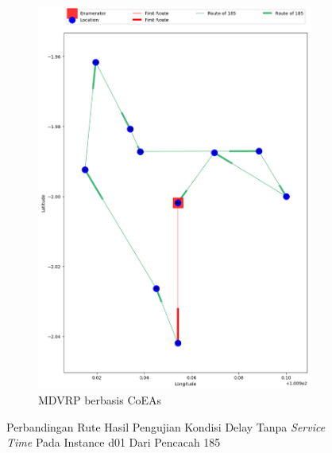 \begin{figure}[H]
	\centering
	\begin{subfigure}[t]{\textwidth}
		\centering
		\includegraphics[width=\textwidth]{Resources/Images/delayed_1/real_m15_n100_delayed_1_185_coes}
		\caption{MDVRP berbasis CoEAs}
		\label{fig:real_m15_n100_delayed_1_185_coes}
	\end{subfigure}
	\caption{Perbandingan Rute Hasil Pengujian Kondisi Delay Tanpa \textit{Service Time} Pada Instance d01 Dari Pencacah 185}
	\label{fig:real_m15_n100_delayed_1_185}
\end{figure}


